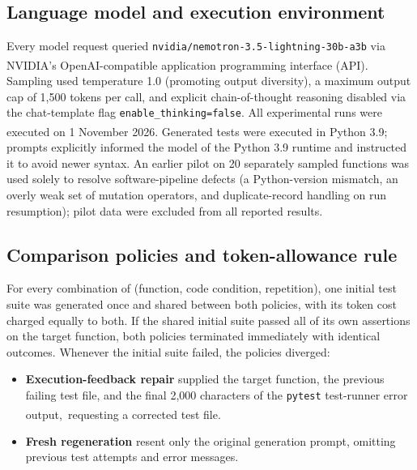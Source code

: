 \documentclass[11pt,a4paper]{article}
\newcommand{\ysjcite}[1]{\,\textsuperscript{\cite{#1}}}
\begin{document}
\subsection{Language model and execution environment}
Every model request queried \texttt{nvidia/nemotron-3.5-lightning-30b-a3b} via NVIDIA's OpenAI-compatible application programming interface (API).\ysjcite{nvidia_nemotron35} Sampling used temperature 1.0 (promoting output diversity), a maximum output cap of 1{,}500 tokens per call, and explicit chain-of-thought reasoning disabled via the chat-template flag \texttt{enable\_thinking=false}. All experimental runs were executed on 1 November 2026. Generated tests were executed in Python 3.9;\ysjcite{python39} prompts explicitly informed the model of the Python 3.9 runtime and instructed it to avoid newer syntax. An earlier pilot on 20 separately sampled functions was used solely to resolve software-pipeline defects (a Python-version mismatch, an overly weak set of mutation operators, and duplicate-record handling on run resumption); pilot data were excluded from all reported results.

\subsection{Comparison policies and token-allowance rule}
For every combination of (function, code condition, repetition), one initial test suite was generated once and shared between both policies, with its token cost charged equally to both. If the shared initial suite passed all of its own assertions on the target function, both policies terminated immediately with identical outcomes. Whenever the initial suite failed, the policies diverged:
\begin{itemize}[leftmargin=*,nosep]
  \item \textbf{Execution-feedback repair} supplied the target function, the previous failing test file, and the final 2{,}000 characters of the \texttt{pytest} test-runner error output,\ysjcite{pytest} requesting a corrected test file.
  \item \textbf{Fresh regeneration} resent only the original generation prompt, omitting previous test attempts and error messages.
\end{itemize}
\end{document}
